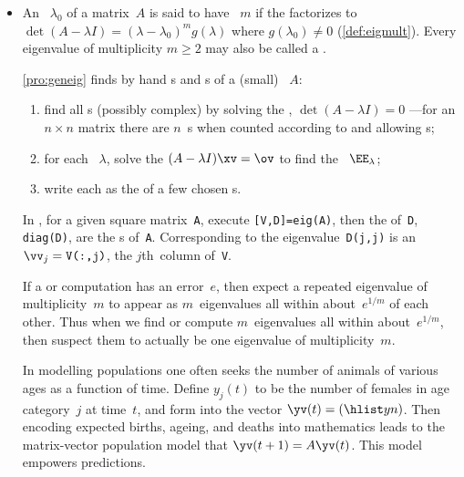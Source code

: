 \begin{itemize}
\item An ~\(\lambda_0\) of a matrix~\(A\) is said to have ~\(m\) if the  factorizes to \(\det(A-\lambda I)=(\lambda-\lambda_0)^mg(\lambda)\) where \(g(\lambda_0)\neq0\) (\autoref{def:eigmult}).
Every eigenvalue of multiplicity \(m\geq2\) may also be called a .

\itemme \autoref{pro:geneig} finds by hand s and s of a (small) ~\(A\):
\begin{enumerate}
\item find all s (possibly complex) by solving the , \(\det(A-\lambda I)=0\) ---for an \(n\times n\) matrix there are \(n\)~s when counted according to  and allowing s;
\item for each ~\(\lambda\), solve the   \((A-\lambda I)\xv=\ov\) to find the ~\(\EE_\lambda\);
\item write each  as the  of a few chosen s.
\end{enumerate}

In \script, for a given square matrix~\verb|A|, execute 
\verb|[V,D]=eig(A)|, then the  of~\verb|D|, 
\verb|diag(D)|, are the s of~\verb|A|. 
Corresponding to the eigenvalue~\verb|D(j,j)| is an   \(\vv_j=\verb|V(:,j)|\), the \(j\)th~column of~\verb|V|.  

\itemme If a  or computation has an error~\(e\), then expect a repeated eigenvalue of multiplicity~\(m\) to appear as \(m\)~eigenvalues all within about~\(e^{1/m}\) of each other.
Thus when we find or compute \(m\)~eigenvalues all within about~\(e^{1/m}\), then suspect them to actually be one eigenvalue of multiplicity~\(m\).

\itemhi In modelling populations one often seeks the number of animals of various ages as a function of time.
Define \(y_j(t)\) to be the number of females in age category~\(j\) at time~\(t\), and form into the vector \(\yv(t)=(\hlist yn)\).
Then encoding expected births, ageing, and deaths into mathematics leads to the matrix-vector population model that \(\yv(t+1)=A\yv(t)\).
This model empowers predictions.



\end{itemize}
